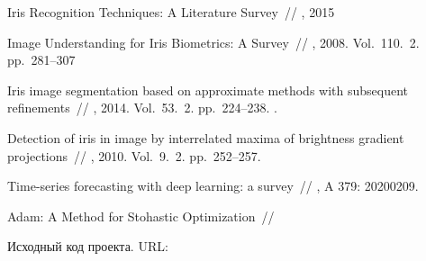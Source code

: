 \documentclass[12pt, twoside]{article}
\begin{document}
\begin{thebibliography}{99}


   Iris Recognition Techniques: A Literature Survey~//
    , 2015

   Image Understanding for Iris Biometrics: A Survey~//
    , 2008. Vol.~110. \No\,2. pp.~281--307
	
   Iris image segmentation based on approximate methods
with subsequent refinements~//
    , 2014. Vol.~53. \No\,2. pp.~224--238.
	.
	
   Detection of iris in image by interrelated maxima of brightness gradient projections~//
    , 2010. Vol.~9. \No\,2. pp.~252--257.
    
    Time-series forecasting with deep learning: a survey~//
	, A 379: 20200209.
	
	Adam: A Method for Stohastic Optimization~//
	
	Исходный код проекта.
	URL: 
 
 	
\end{thebibliography}

\end{document}

